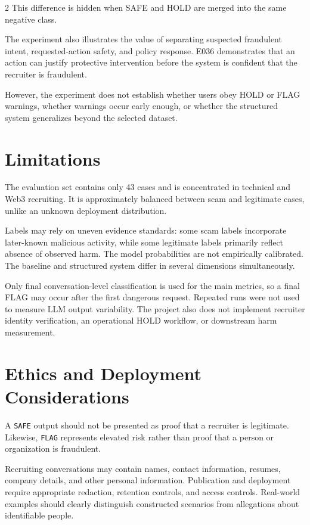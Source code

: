 \documentclass{article}
\begin{document}
\begin{multicols}{2}
This difference is hidden when SAFE and HOLD are merged into the same negative class.

The experiment also illustrates the value of separating suspected fraudulent intent, requested-action safety, and policy response. E036 demonstrates that an action can justify protective intervention before the system is confident that the recruiter is fraudulent.

However, the experiment does not establish whether users obey HOLD or FLAG warnings, whether warnings occur early enough, or whether the structured system generalizes beyond the selected dataset.

\section{Limitations}

The evaluation set contains only 43 cases and is concentrated in technical and Web3 recruiting. It is approximately balanced between scam and legitimate cases, unlike an unknown deployment distribution.

Labels may rely on uneven evidence standards: some scam labels incorporate later-known malicious activity, while some legitimate labels primarily reflect absence of observed harm. The model probabilities are not empirically calibrated. The baseline and structured system differ in several dimensions simultaneously.

Only final conversation-level classification is used for the main metrics, so a final FLAG may occur after the first dangerous request. Repeated runs were not used to measure LLM output variability. The project also does not implement recruiter identity verification, an operational HOLD workflow, or downstream harm measurement.

\section{Ethics and Deployment Considerations}

A \texttt{SAFE} output should not be presented as proof that a recruiter is legitimate. Likewise, \texttt{FLAG} represents elevated risk rather than proof that a person or organization is fraudulent.

Recruiting conversations may contain names, contact information, resumes, company details, and other personal information. Publication and deployment require appropriate redaction, retention controls, and access controls. Real-world examples should clearly distinguish constructed scenarios from allegations about identifiable people.


\end{multicols}
\end{document}
